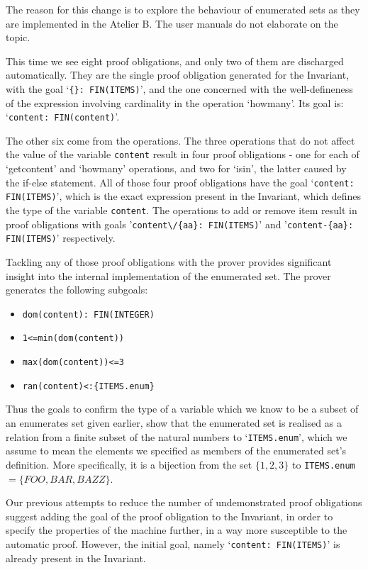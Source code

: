 \documentclass[12pt,journal,duplex]{IEEEtran}
\begin{document}
	The reason for this change is to explore the behaviour of enumerated sets as they are implemented in the Atelier B. The user manuals do not elaborate on the topic.

	This time we see eight proof obligations, and only two of them are discharged automatically. They are the single proof obligation generated for the Invariant, with the goal `\texttt{\{\}: FIN(ITEMS)}', and the one concerned with the well-defineness of the expression involving cardinality in the operation `howmany'. Its goal is: `\texttt{content: FIN(content)}'.

	The other six come from the operations. The three operations that do not affect the value of the variable \texttt{content} result in four proof obligations - one for each of `getcontent' and `howmany' operations, and two for `isin', the latter caused by the if-else statement. All of those four proof obligations have the goal `\texttt{content: FIN(ITEMS)}', which is the exact expression present in the Invariant, which defines the type of the variable \texttt{content}. The operations to add or remove item result in proof obligations with goals '\verb|content\/{aa}: FIN(ITEMS)|' and '\verb|content-{aa}: FIN(ITEMS)|' respectively.

	Tackling any of those proof obligations with the prover provides significant insight into the internal implementation of the enumerated set. The prover generates the following subgoals:

	\begin{itemize}
		\item \verb|dom(content): FIN(INTEGER)|
		\item \verb|1<=min(dom(content))|
		\item \verb|max(dom(content))<=3|
		\item \verb|ran(content)<:{ITEMS.enum}|
	\end{itemize}
	Thus the goals to confirm the type of a variable which we know to be a subset of an enumerates set given earlier, show that the enumerated set is realised as a relation from a finite subset of the natural numbers to `\texttt{ITEMS.enum}', which we assume to mean the elements we specified as members of the enumerated set's definition. More specifically, it is a bijection from the set $\{1,2,3\}$ to \texttt{ITEMS.enum} $= \{FOO, BAR, BAZZ\}$.

	Our previous attempts to reduce the number of undemonstrated proof obligations suggest adding the goal of the proof obligation to the Invariant, in order to specify the properties of the machine further, in a way more susceptible to the automatic proof. However, the initial goal, namely `\texttt{content: FIN(ITEMS)}' is already present in the Invariant.
\end{document}
